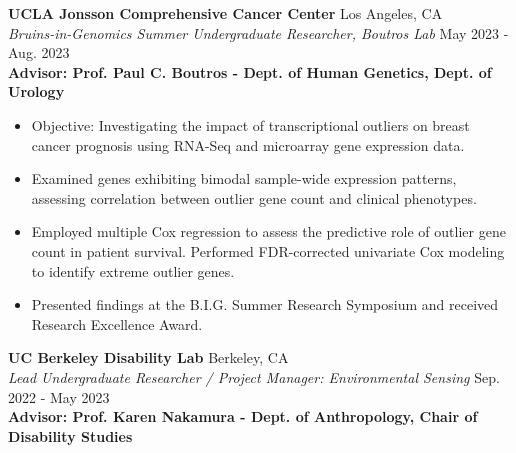 \documentclass[a4paper]{article}
\begin{document}
\textbf{UCLA Jonsson Comprehensive Cancer Center} \hfill Los Angeles, CA\\
\textit{Bruins-in-Genomics Summer Undergraduate Researcher, Boutros Lab} \hfill May 2023 - Aug. 2023\\
\vspace{2mm}
\setlength\leftskip{25pt}
\textbf{Advisor: Prof. Paul C. Boutros - Dept. of Human Genetics, Dept. of Urology}\\
\setlength\leftskip{0pt}
\vspace{-2mm}
\begin{itemize} \itemsep 1pt
	\setlength\itemsep{0pt}  %
	\setlength\parskip{0pt}  %
	\setlength\parsep{0pt}  %
	\setlength\leftskip{0pt}  %
	\renewcommand\labelitemi{\tiny$\bullet$} %
	\item Objective: Investigating the impact of transcriptional outliers on breast cancer prognosis using RNA-Seq and microarray gene expression data. \item Examined genes exhibiting bimodal sample-wide expression patterns, assessing correlation between outlier gene count and clinical phenotypes. 
 \item Employed multiple Cox regression to assess the predictive role of outlier gene count in patient survival. Performed FDR-corrected univariate Cox modeling to identify extreme outlier genes.  \item Presented findings at the B.I.G. Summer Research Symposium and received Research Excellence Award.
\end{itemize}
\textbf{UC Berkeley Disability Lab} \hfill Berkeley, CA\\
\textit{Lead Undergraduate Researcher / Project Manager: Environmental Sensing} \hfill Sep. 2022 - May 2023\\
\vspace{2mm}
\setlength\leftskip{25pt}
\textbf{Advisor: Prof. Karen Nakamura - Dept. of Anthropology, Chair of Disability Studies}\\
\setlength\leftskip{0pt}
\vspace{-2mm}
\end{document}
